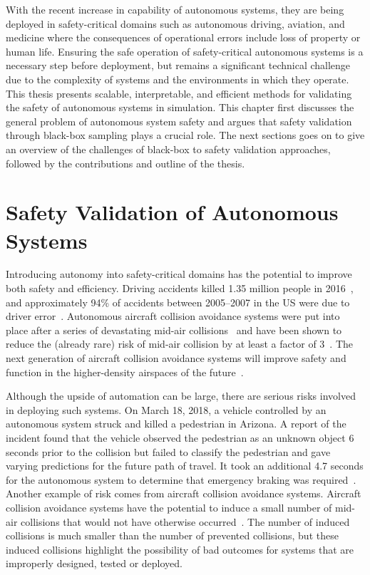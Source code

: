 With the recent increase in capability of autonomous systems, they are being deployed in safety-critical domains such as autonomous driving, aviation, and medicine where the consequences of operational errors include loss of property or human life. Ensuring the safe operation of safety-critical autonomous systems is a necessary step before deployment, but remains a significant technical challenge due to the complexity of systems and the environments in which they operate. This thesis presents scalable, interpretable, and efficient methods for validating the safety of autonomous systems in simulation. This chapter first discusses the general problem of autonomous system safety and argues that safety validation through black-box sampling plays a crucial role. The next sections goes on to give an overview of the challenges of black-box to safety validation approaches, followed by the contributions and outline of the thesis.

\section{Safety Validation of Autonomous Systems}

Introducing autonomy into safety-critical domains has the potential to improve both safety and efficiency. Driving accidents killed \num{1.35} million people in 2016~\cite{world2019global}, and approximately \num{94}\% of accidents between 2005--2007 in the US were due to driver error~\cite{singh2015critical}. Autonomous aircraft collision avoidance systems were put into place after a series of devastating mid-air collisions~\cite{federal2011introduction} and have been shown to reduce the (already rare) risk of mid-air collision by at least a factor of 3~\cite{arino2002studies}. The next generation of aircraft collision avoidance systems will improve safety and function in the higher-density airspaces of the future~\cite{kochenderfer2012next}.

Although the upside of automation can be large, there are serious risks involved in deploying such systems. On March 18, 2018, a vehicle controlled by an autonomous system struck and killed a pedestrian in Arizona. A report of the incident found that the vehicle observed the pedestrian as an unknown object \num{6} seconds prior to the collision but failed to classify the pedestrian and gave varying predictions for the future path of travel. It took an additional \num{4.7} seconds for the autonomous system to determine that emergency braking was required~\cite{board2018preliminary}. Another example of risk comes from aircraft collision avoidance systems. Aircraft collision avoidance systems have the potential to induce a small number of mid-air collisions that would not have otherwise occurred~\cite{arino2002studies}. The number of induced collisions is much smaller than the number of prevented collisions, but these induced collisions highlight the possibility of bad outcomes for systems that are improperly designed, tested or deployed.

